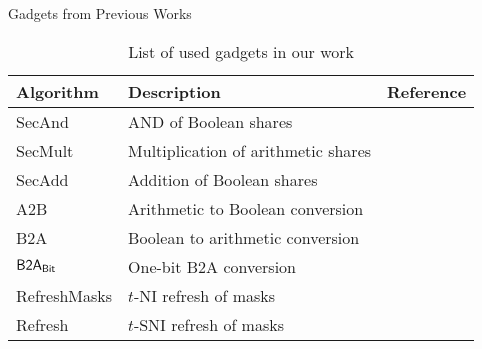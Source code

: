\begin{frame}{Gadgets from Previous Works}

\begin{table}
\centering
	\begin{tabular}{ l l c} 
	\toprule
	\textbf{Algorithm} & \textbf{Description} & \textbf{Reference} \\
	\midrule
	{\sf SecAnd} & AND of Boolean shares & \cite{C:IshSahWag03, CCS:BBDFGS16} \\
	{\sf SecMult} & Multiplication of arithmetic shares & \cite{C:IshSahWag03, CCS:BBDFGS16} \\
	{\sf SecAdd} & Addition of Boolean shares & \cite{FSE:CGTV15, EC:BBEFGR18} \\
	{\sf A2B} & Arithmetic to Boolean conversion & \cite{PKC:SPOG19} \\
	{\sf B2A} & Boolean to arithmetic conversion & \cite{TCHES:BetCorZei18} \\
	${\sf B2A_{Bit}}$ & One-bit {\sf B2A} conversion & \cite{PKC:SPOG19} \\
	{\sf RefreshMasks} & $t$-NI refresh of masks & \cite{CCS:BBDFGS16, TCHES:BetCorZei18} \\
	{\sf Refresh} & $t$-SNI refresh of masks & \cite{CCS:BBDFGS16} \\
	\bottomrule
	\end{tabular}
	\caption{List of used gadgets in our work}
	\label{table:gadgets}
\end{table}

\end{frame}
